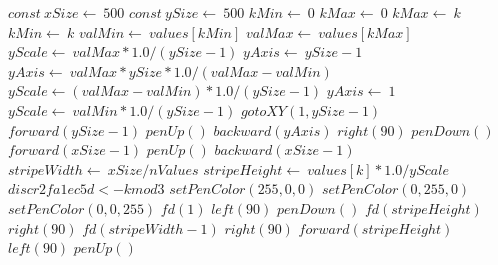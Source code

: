 \documentclass[a4paper,10pt]{article}
\begin{document}
\begin{algorithm}
\caption{drawBarChart(values, nValues)}
\begin{algorithmic}[5]

\STATE {}
\STATE {}
\STATE {}
\STATE {}
  \STATE \(const\ xSize\gets\ 500\)
  \STATE \(const\ ySize\gets\ 500\)
  \STATE \(kMin\gets\ 0\)
  \STATE \(kMax\gets\ 0\)
      \STATE \(kMax\gets\ k\)
    \ELSE
        \STATE \(kMin\gets\ k\)
      \ENDIF
    \ENDIF
  \ENDFOR
  \STATE \(valMin\gets\ values[kMin]\)
  \STATE \(valMax\gets\ values[kMax]\)
  \STATE \(yScale\gets\ valMax*1.0/(ySize-1)\)
  \STATE \(yAxis\gets\ ySize-1\)
      \STATE \(yAxis\gets\ valMax*ySize*1.0/(valMax-valMin)\)
      \STATE \(yScale\gets(valMax-valMin)*1.0/(ySize-1)\)
    \ELSE
      \STATE \(yAxis\gets\ 1\)
      \STATE \(yScale\gets\ valMin*1.0/(ySize-1)\)
    \ENDIF
  \ENDIF
  \STATE \(gotoXY(1,ySize-1)\)
  \STATE \(forward(ySize-1)\)
  \STATE \(penUp()\)
  \STATE \(backward(yAxis)\)
  \STATE \(right(90)\)
  \STATE \(penDown()\)
  \STATE \(forward(xSize-1)\)
  \STATE \(penUp()\)
  \STATE \(backward(xSize-1)\)
  \STATE \(stripeWidth\gets\ xSize/nValues\)
    \STATE \(stripeHeight\gets\ values[k]*1.0/yScale\)
    \STATE \(discr2fa1ec5d <- k mod 3\)
      \STATE \(setPenColor(255,0,0)\)
      \STATE \(setPenColor(0,255,0)\)
      \STATE \(setPenColor(0,0,255)\)
    \ENDIF
    \STATE \(fd(1)\)
    \STATE \(left(90)\)
    \STATE \(penDown()\)
    \STATE \(fd(stripeHeight)\)
    \STATE \(right(90)\)
    \STATE \(fd(stripeWidth-1)\)
    \STATE \(right(90)\)
    \STATE \(forward(stripeHeight)\)
    \STATE \(left(90)\)
    \STATE \(penUp()\)
  \ENDFOR

\end{algorithmic}
\end{algorithm}
\end{document}
